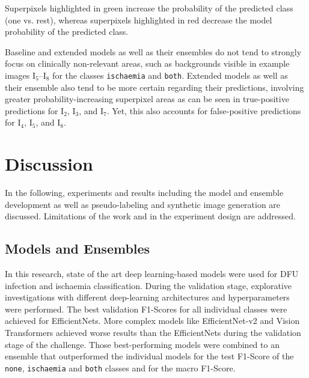 \documentclass[runningheads]{llncs}
\begin{document}
Superpixels highlighted in green increase the probability of the predicted class (one vs. rest), whereas superpixels highlighted in red decrease the model probability of the predicted class. 

Baseline and extended models as well as their ensembles do not tend to strongly focus on clinically non-relevant areas, such as backgrounds visible in example images I$_5$--I$_8$ for the classes \texttt{ischaemia} and \texttt{both}. Extended models as well as their ensemble also tend to be more certain regarding their predictions, involving greater probability-increasing superpixel areas as can be seen in true-positive predictions for I$_2$, I$_3$, and I$_7$. Yet, this also accounts for false-positive predictions for I$_4$, I$_5$, and I$_8$.




\section{Discussion} %
\label{sec:discussion}

In the following, experiments and results including the model and ensemble development as well as pseudo-labeling and synthetic image generation are discussed. Limitations of the work and in the experiment design are addressed. 


\subsection{Models and Ensembles} %

In this research, state of the art deep learning-based models were used for DFU infection and ischaemia classification. During the validation stage, explorative investigations with different deep-learning architectures and hyperparameters were performed. The best validation F1-Scores for all individual classes were achieved for EfficientNets. More complex models like EfficientNet-v2 and Vision Transformers achieved worse results than the EfficientNets during the validation stage of the challenge. Those best-performing models were combined to an ensemble that outperformed the individual models for the test F1-Score of the \texttt{none}, \texttt{ischaemia} and \texttt{both} classes and for the macro F1-Score. 
\end{document}
